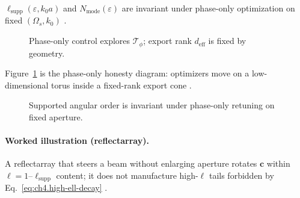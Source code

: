 \begin{lemma}
\label{lem:ch4.phase-retune-invariant}
\(\ell_{\mathrm{supp}}(\varepsilon,k_{0}a)\) and \(N_{\mathrm{mode}}(\varepsilon)\) are invariant under phase-only optimization on fixed \((\Omega_{s},k_{0})\)
\cite{hansen1988,stratton1941,harrington2001,devaney2004,jackson1999}.
\end{lemma}

\begin{figure}[t]
\centering
{}
\caption{Phase-only control explores \(\mathcal{T}_{\phi}\); export rank \(d_{\mathrm{eff}}\) is fixed by geometry.}
\label{fig:ch4.phase-tangent-manifold}
\end{figure}

Figure~\ref{fig:ch4.phase-tangent-manifold} is the phase-only honesty diagram: optimizers move on a low-dimensional torus inside a fixed-rank export cone
\cite{stratton1941,harrington2001,devaney2004}.

\begin{figure}[t]
\centering
{}
\caption{Supported angular order is invariant under phase-only retuning on fixed aperture.}
\label{fig:ch4.phase-ell-ceiling}
\end{figure}

\paragraph{Worked illustration (reflectarray).}
A reflectarray that steers a beam without enlarging aperture rotates \(\mathbf{c}\) within \(\ell=1\)--\(\ell_{\mathrm{supp}}\) content;
it does not manufacture high-\(\ell\) tails forbidden by Eq.~\eqref{eq:ch4.high-ell-decay} \cite{hansen1988,jackson1999,harrington2001,collin2001}.

